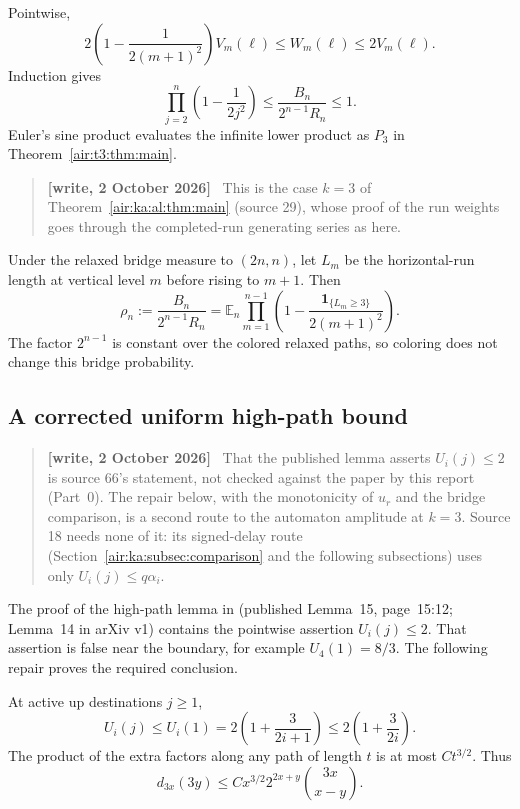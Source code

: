 \documentclass[11pt,letterpaper]{article}
\numberwithin{equation}{section}
\theoremstyle{remark}
\newcommand{\one}{\mathbf1}
\newenvironment{writenote}{\par\smallskip\begin{quote}\small\textbf{[write, 2 October 2026]}\ }{\end{quote}\smallskip}
\begin{document}
Pointwise,
\[
2\left(1-\frac1{2(m+1)^2}\right)V_m(\ell)
\le W_m(\ell)\le2V_m(\ell).
\]
Induction gives
\begin{equation}\label{air:t3:eq:comparison}
\prod_{j=2}^n\left(1-\frac1{2j^2}\right)
\le\frac{B_n}{2^{n-1}R_n}\le1.
\end{equation}
Euler's sine product evaluates the infinite lower product as $P_3$ in Theorem~\ref{air:t3:thm:main}.
\begin{writenote}
This is the case $k=3$ of Theorem~\ref{air:ka:al:thm:main} (source 29), whose proof of the run weights goes through the completed-run generating series as here.
\end{writenote}


Under the relaxed bridge measure to $(2n,n)$, let $L_m$ be the horizontal-run length at vertical level $m$ before rising to $m+1$. Then
\begin{equation}\label{air:t3:eq:defects}
\rho_n:=\frac{B_n}{2^{n-1}R_n}
=\mathbb E_n\prod_{m=1}^{n-1}
\left(1-\frac{\one_{\{L_m\ge3\}}}{2(m+1)^2}\right).
\end{equation}
The factor $2^{n-1}$ is constant over the colored relaxed paths, so coloring does not change this bridge probability.

\subsection{A corrected uniform high-path bound}\label{air:t3:subsec:hightail}
\begin{writenote}
That the published lemma asserts $U_i(j)\le2$ is source 66's statement, not checked against the paper by this report (Part~0). The repair below, with the monotonicity of $u_r$ and the bridge comparison, is a second route to the automaton amplitude at $k=3$. Source 18 needs none of it: its signed-delay route (Section~\ref{air:ka:subsec:comparison} and the following subsections) uses only $U_i(j)\le q\alpha_i$.
\end{writenote}

The proof of the high-path lemma in \cite{gdw} (published Lemma~15, page~15:12; Lemma~14 in arXiv v1) contains the pointwise assertion $U_i(j)\le2$. That assertion is false near the boundary, for example $U_4(1)=8/3$. The following repair proves the required conclusion.

At active up destinations $j\ge1$,
\[
U_i(j)\le U_i(1)=2\left(1+\frac3{2i+1}\right)
\le2\left(1+\frac3{2i}\right).
\]
The product of the extra factors along any path of length $t$ is at most $Ct^{3/2}$. Thus
\begin{equation}\label{air:t3:eq:binomial}
d_{3x}(3y)\le Cx^{3/2}2^{2x+y}\binom{3x}{x-y}.
\end{equation}
\end{document}
